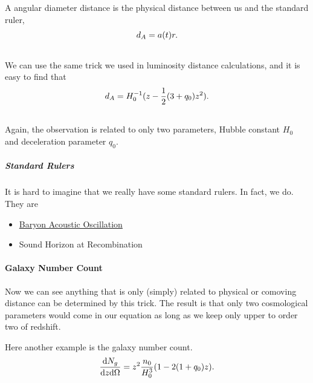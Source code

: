 \documentclass[letterpaper,10pt,english]{sphinxmanual}
\begin{document}
A angular diameter distance is the physical distance between us and the standard ruler,
\begin{gather}
\begin{split}d_A = a(t)r .\end{split}\notag\\\begin{split}\end{split}\notag
\end{gather}
We can use the same trick we used in luminosity distance calculations, and it is easy to find that
\begin{gather}
\begin{split}d_A = H_0^{-1} (z - \frac{1}{2} (3 + q_0)z^2 ) .\end{split}\notag\\\begin{split}\end{split}\notag
\end{gather}
Again, the observation is related to only two parameters, Hubble constant $H_0$ and deceleration parameter $q_0$.


\subparagraph{Standard Rulers}
\label{Cosmology/cosmoIndex:standard-rulers}
It is hard to imagine that we really have some standard rulers. In fact, we do. They are
\begin{itemize}
\item {} 
\href{https://en.wikipedia.org/wiki/Baryon\_acoustic\_oscillations}{Baryon Acoustic Oscillation}

\item {} 
Sound Horizon at Recombination

\end{itemize}


\paragraph{Galaxy Number Count}
\label{Cosmology/cosmoIndex:galaxy-number-count}
Now we can see anything that is only (simply) related to physical or comoving distance can be determined by this trick. The result is that only two cosmological parameters would come in our equation as long as we keep only upper to order two of redshift.

Here another example is the galaxy number count.
\begin{gather}
\begin{split}\frac{\mathrm d N_g}{\mathrm d z \mathrm d\Omega} = z^2 \frac{n_0}{H_0^3}  (1-2(1+q_0) z) .\end{split}\notag\\\begin{split}\end{split}\notag
\end{gather}
\end{document}
